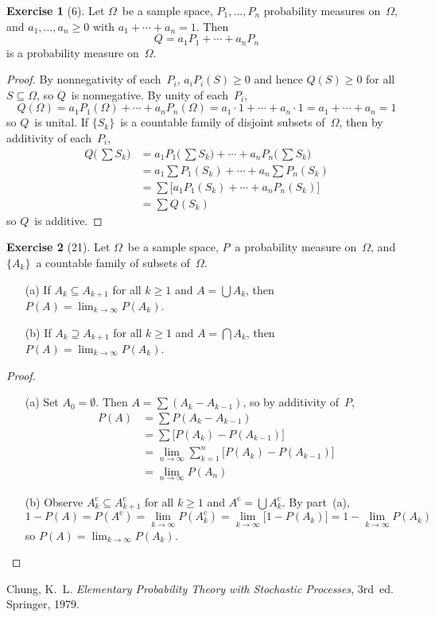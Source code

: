 \documentclass[letterpaper,12pt]{article}
\newcommand{\bigunion}{\bigcup}
\newcommand{\bigsect}{\bigcap}
\newcommand{\comp}[1]{#1^{\text{c}}}
\theoremstyle{definition}
\newtheorem*{exer}{Exercise}
\theoremstyle{remark}
\begin{document}
\begin{exer}[6]
Let \(\Omega\)~be a sample space, \(P_1,\ldots,P_n\) probability measures on~\(\Omega\), and \(a_1,\ldots,a_n\ge0\) with \(a_1+\cdots+a_n=1\). Then
\[Q=a_1P_1+\cdots+a_nP_n\]
is a probability measure on~\(\Omega\).
\end{exer}
\begin{proof}
By nonnegativity of each~\(P_i\), \(a_iP_i(S)\ge0\) and hence \(Q(S)\ge0\) for all \(S\subseteq\Omega\), so \(Q\)~is nonnegative. By unity of each~\(P_i\),
\[Q(\Omega)=a_1P_1(\Omega)+\cdots+a_nP_n(\Omega)=a_1\cdot1+\cdots+a_n\cdot1=a_1+\cdots+a_n=1\]
so \(Q\)~is unital. If \(\{S_k\}\)~is a countable family of disjoint subsets of~\(\Omega\), then by additivity of each~\(P_i\),
\begin{align*}
Q\bigl(\,\sum S_k\bigr)&=a_1P_1\bigl(\,\sum S_k\bigl)+\cdots+a_nP_n\bigl(\,\sum S_k\bigr)\\
	&=a_1\sum P_1(S_k)+\cdots+a_n\sum P_n(S_k)\\
	&=\sum\bigl[a_1P_1(S_k)+\cdots+a_nP_n(S_k)\bigr]\\
	&=\sum Q(S_k)
\end{align*}
so \(Q\)~is additive.
\end{proof}

\begin{exer}[21]
Let \(\Omega\)~be a sample space, \(P\)~a probability measure on~\(\Omega\), and \(\{A_k\}\)~a countable family of subsets of~\(\Omega\).
\begin{enumerate}[itemsep=0pt]
\item[(a)] If \(A_k\subseteq A_{k+1}\) for all \(k\ge1\) and \(A=\bigunion A_k\), then \(P(A)=\lim_{k\to\infty}P(A_k)\).
\item[(b)] If \(A_k\supseteq A_{k+1}\) for all \(k\ge1\) and \(A=\bigsect A_k\), then \(P(A)=\lim_{k\to\infty}P(A_k)\).
\end{enumerate}
\end{exer}
\begin{proof}
\begin{enumerate}[itemsep=0pt]
\item[(a)] Set \(A_0=\emptyset\). Then \(A=\sum(A_k-A_{k-1})\), so by additivity of~\(P\),
\begin{align*}
P(A)&=\sum P(A_k-A_{k-1})\\
	&=\sum\bigl[P(A_k)-P(A_{k-1})\bigr]\\
	&=\lim_{n\to\infty}\sum_{k=1}^n\bigl[P(A_k)-P(A_{k-1})\bigr]\\
	&=\lim_{n\to\infty}P(A_n)
\end{align*}
\item[(b)] Observe \(\comp{A_k}\subseteq\comp{A_{k+1}}\) for all \(k\ge1\) and \(\comp{A}=\bigunion\comp{A_k}\). By part~(a),
\[1-P(A)=P(\comp{A})=\lim_{k\to\infty}P(\comp{A_k})=\lim_{k\to\infty}\bigl[1-P(A_k)\bigr]=1-\lim_{k\to\infty}P(A_k)\]
so \(P(A)=\lim_{k\to\infty}P(A_k)\).\qedhere
\end{enumerate}
\end{proof}

\begin{thebibliography}{0}
 Chung, K.~L. \textit{Elementary Probability Theory with Stochastic Processes}, 3rd~ed. Springer, 1979.
\end{thebibliography}
\end{document}
